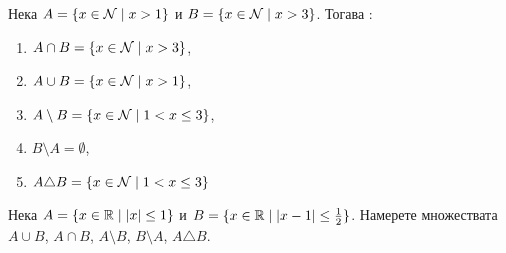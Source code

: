 
\begin{example}
  Нека $A = \{x\in\mathcal{N}\mid x > 1\}$ и $B = \{x\in\mathcal{N}\mid x>3\}$. Тогава :
    \begin{enumerate}[]
    \item
      $A\cap B = \{x\in\mathcal{N}\mid x > 3\}$,
    \item
      $A\cup B = \{x\in\mathcal{N}\mid x > 1\}$,
    \item
      $A\setminus B = \{x\in\mathcal{N}\mid 1<x\leq 3\}$,
    \item
      $B\setminus A = \emptyset$,
    \item
      $A\triangle B = \{x\in\mathcal{N}\mid 1<x\leq 3\}$
    \end{enumerate}
\end{example}


\begin{problem}
  Нека $A = \{x\in\mathbb{R}\mid |x|\leq 1\}$ и $B = \{x\in\mathbb{R}\mid |x-1|\leq \frac{1}{2}\}$.
  Намерете множествата $A\cup B$, $A\cap B$, $A\setminus B$, $B\setminus A$, $A\triangle B$.
\end{problem}






